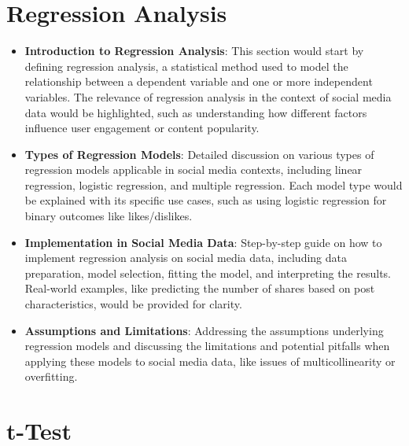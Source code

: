 \documentclass[
]{book}
\providecommand{\tightlist}{%
  \setlength{\itemsep}{0pt}\setlength{\parskip}{0pt}}
\begin{document}
\hypertarget{regression-analysis}{%
\section*{Regression Analysis}\label{regression-analysis}}

\begin{itemize}
\tightlist
\item
  \textbf{Introduction to Regression Analysis}: This section would start by defining regression analysis, a statistical method used to model the relationship between a dependent variable and one or more independent variables. The relevance of regression analysis in the context of social media data would be highlighted, such as understanding how different factors influence user engagement or content popularity.
\item
  \textbf{Types of Regression Models}: Detailed discussion on various types of regression models applicable in social media contexts, including linear regression, logistic regression, and multiple regression. Each model type would be explained with its specific use cases, such as using logistic regression for binary outcomes like likes/dislikes.
\item
  \textbf{Implementation in Social Media Data}: Step-by-step guide on how to implement regression analysis on social media data, including data preparation, model selection, fitting the model, and interpreting the results. Real-world examples, like predicting the number of shares based on post characteristics, would be provided for clarity.
\item
  \textbf{Assumptions and Limitations}: Addressing the assumptions underlying regression models and discussing the limitations and potential pitfalls when applying these models to social media data, like issues of multicollinearity or overfitting.
\end{itemize}

\hypertarget{t-test}{%
\section*{t-Test}\label{t-test}}
\end{document}
